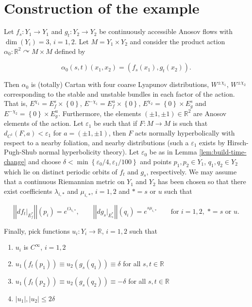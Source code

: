 \documentclass[12pt]{amsart}
\theoremstyle{definition}
\theoremstyle{remark}
\numberwithin{equation}{section}
\newcommand{\R}{\mathbb{R}}
\newcommand{\set}[1]{\left\lbrace #1 \right\rbrace}
\newcommand{\abs}[1]{\left| #1 \right|}
\newcommand{\norm}[1]{{\left|\left| #1 \right|\right|}}
\newcommand{\ve}{\varepsilon}
\newtheorem{Structural Stability Theorem}[theorem]{Structural Stability Theorem}
\begin{document}
\section{Construction of the example}

Let $f_s : Y_1 \to Y_1$ and $g_t : Y_2 \to Y_2$ be continuously accessible Anosov flows { with $\dim(Y_i) = 3$, $i = 1,2$}. 
Let $M = Y_1 \times Y_2$ and consider the product action $\alpha_0 : \R^2 \curvearrowright M \times M$ defined by

\[\alpha_0(s,t)(x_1,x_2) = (f_s(x_1),g_t(x_2)). \]

Then $\alpha_0$ is (totally) Cartan with four coarse Lyapunov distributions, $W^{\pm \chi_1}$, $W^{\pm \chi_2}$ corresponding to the stable and unstable bundles in each factor of the action. That is, $E^{\chi_1} = E^s_f \times \set{0}$, $E^{-\chi_1} = E^u_f \times \set{0}$, $E^{\chi_2} = \set{0} \times E^s_g$ and $E^{-\chi_2} = \set{0} \times E^u_g$. Furthermore, the elements $(\pm 1,\pm 1) \in \R^2$ are Anosov elements of the action. Let $\ve_1$ be such that if $F : M \to M$ is such that $d_{C^1}(F,a) < \ve_1$ for $a = (\pm 1,\pm 1)$, then $F$ acts normally hyperbolically with respect to a nearby foliation, and nearby distributions (such a $\ve_1$ exists by Hirsch-Pugh-Shub normal hyperbolicity theory). Let $\ve_0$ be as in Lemma \ref{lem:build-time-change} and choose $\delta < \min\set{\ve_0/4,\ve_1/100}$ and points $p_1,p_2 \in Y_1$, $q_1,q_2 \in Y_2$ which lie on distinct periodic orbits of $f_t$ and $g_s$, respectively. We may assume that a continuous Riemannian metric on $Y_1$ and $Y_2$ has been chosen so that there exist coefficients $\lambda_{i,*}$ and $\mu_{i,*}$, $i = 1,2$ and $* = s$ or $u$ such that

\[ \norm{df_t|_{E^*_f}}(p_i) = e^{t\lambda_{i,*}}, \qquad \norm{dg_s|_{E^*_s}}(q_i) = e^{s\mu_{i,*}} \qquad \mbox{for }i=1,2, \; * = s \mbox{ or }u. \]

 Finally, pick functions $u_i : Y_i \to \R$, $i = 1,2$ such that

\begin{enumerate}
\item $u_i$ is $C^\infty$, $i = 1,2$
\item $u_1(f_t(p_1)) \equiv u_2(g_s(q_1)) \equiv \delta$ for all $s,t \in \R$
\item $u_1(f_t(p_2)) \equiv u_2(g_s(q_2)) \equiv -\delta$ for all $s,t \in \R$
\item $\abs{u_1},\abs{u_2} \le 2\delta$
\end{enumerate}
\end{document}
